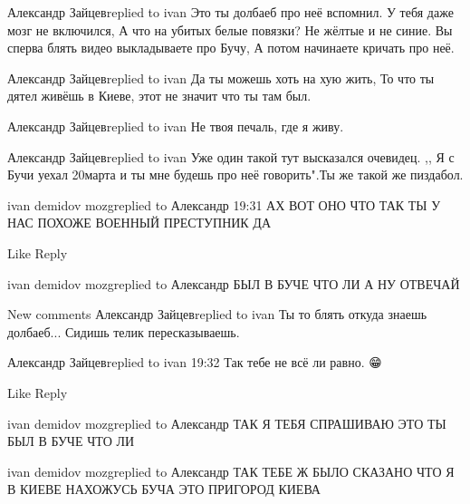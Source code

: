  
 
 
 
 

Александр Зайцевreplied to ivan
Это ты долбаеб про неё вспомнил. У тебя даже мозг не включился, А что на убитых белые повязки? Не жёлтые и не синие. Вы сперва блять видео выкладываете про Бучу, А потом начинаете кричать про неё.

Александр Зайцевreplied to ivan
Да ты можешь хоть на хую жить, То что ты дятел живёшь в Киеве, этот не значит что ты там был.

Александр Зайцевreplied to ivan
Не твоя печаль, где я живу.

Александр Зайцевreplied to ivan
Уже один такой тут высказался очевидец. ,, Я с Бучи уехал 20марта и ты мне будешь про неё говорить".Ты же такой же пиздабол.

ivan demidov mozgreplied to Александр
19:31
АХ ВОТ ОНО ЧТО ТАК ТЫ У НАС ПОХОЖЕ ВОЕННЫЙ ПРЕСТУПНИК ДА

    Like
    Reply

ivan demidov mozgreplied to Александр
БЫЛ В БУЧЕ ЧТО ЛИ А НУ ОТВЕЧАЙ

New comments
Александр Зайцевreplied to ivan
Ты то блять откуда знаешь долбаеб... Сидишь телик пересказываешь.

Александр Зайцевreplied to ivan
19:32
Так тебе не всё ли равно. 😁

    Like
    Reply

ivan demidov mozgreplied to Александр
ТАК Я ТЕБЯ СПРАШИВАЮ ЭТО ТЫ БЫЛ В БУЧЕ ЧТО ЛИ

ivan demidov mozgreplied to Александр
ТАК ТЕБЕ Ж БЫЛО СКАЗАНО ЧТО Я В КИЕВЕ НАХОЖУСЬ БУЧА ЭТО ПРИГОРОД КИЕВА
